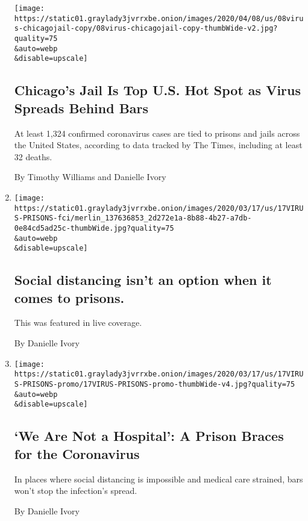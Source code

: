 \begin{enumerate}
  \texttt{[image: https://static01.graylady3jvrrxbe.onion/images/2020/04/08/us/08virus-chicagojail-copy/08virus-chicagojail-copy-thumbWide-v2.jpg?quality=75\\\&auto=webp\\\&disable=upscale]}

  \hypertarget{chicagos-jail-is-top-us-hot-spot-as-virus-spreads-behind-bars}{%
  \subsection{Chicago's Jail Is Top U.S. Hot Spot as Virus Spreads
  Behind
  Bars}\label{chicagos-jail-is-top-us-hot-spot-as-virus-spreads-behind-bars}}

  At least 1,324 confirmed coronavirus cases are tied to prisons and
  jails across the United States, according to data tracked by The
  Times, including at least 32 deaths.

  By Timothy Williams and Danielle Ivory
\item
  \href{/live/2020/coronavirus-covid-19-03-18/social-distancing-isnt-an-option-when-it-comes-to-prisons}{}

  \texttt{[image: https://static01.graylady3jvrrxbe.onion/images/2020/03/17/us/17VIRUS-PRISONS-fci/merlin\_137636853\_2d272e1a-8b88-4b27-a7db-0e84cd5ad25c-thumbWide.jpg?quality=75\\\&auto=webp\\\&disable=upscale]}

  \hypertarget{social-distancing-isnt-an-option-when-it-comes-to-prisons}{%
  \subsection{Social distancing isn't an option when it comes to
  prisons.}\label{social-distancing-isnt-an-option-when-it-comes-to-prisons}}

  This was featured in live coverage.

  By Danielle Ivory
\item
  \href{/2020/03/17/us/coronavirus-prisons-jails.html}{}

  \texttt{[image: https://static01.graylady3jvrrxbe.onion/images/2020/03/17/us/17VIRUS-PRISONS-promo/17VIRUS-PRISONS-promo-thumbWide-v4.jpg?quality=75\\\&auto=webp\\\&disable=upscale]}

  \hypertarget{we-are-not-a-hospital-a-prison-braces-for-the-coronavirus}{%
  \subsection{`We Are Not a Hospital': A Prison Braces for the
  Coronavirus}\label{we-are-not-a-hospital-a-prison-braces-for-the-coronavirus}}

  In places where social distancing is impossible and medical care
  strained, bars won't stop the infection's spread.

  By Danielle Ivory
\end{enumerate}

